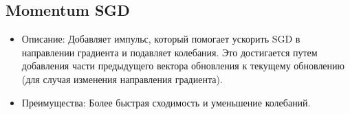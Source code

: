 \documentclass[11pt]{article}
\providecommand{\tightlist}{%
      \setlength{\itemsep}{0pt}\setlength{\parskip}{0pt}}
\begin{document}
    
    
    \subsection{\texorpdfstring{\textbf{Momentum
SGD}}{Momentum SGD}}\label{momentum-sgd}

    \begin{itemize}
\tightlist
\item
  Описание: Добавляет импульс, который помогает ускорить SGD в
  направлении градиента и подавляет колебания. Это достигается путем
  добавления части предыдущего вектора обновления к текущему обновлению
  (для случая изменения направления градиента).
\item
  Преимущества: Более быстрая сходимость и уменьшение колебаний.
\end{itemize}
\end{document}
